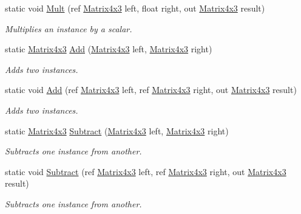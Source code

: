 \begin{DoxyCompactItemize}
static void \hyperlink{struct_open_t_k_1_1_matrix4x3_a7966689e012eb5520343aa46edee40d0}{Mult} (ref \hyperlink{struct_open_t_k_1_1_matrix4x3}{Matrix4x3} left, float right, out \hyperlink{struct_open_t_k_1_1_matrix4x3}{Matrix4x3} result)
\begin{DoxyCompactList}\small\item\em Multiplies an instance by a scalar. \end{DoxyCompactList}\item 
static \hyperlink{struct_open_t_k_1_1_matrix4x3}{Matrix4x3} \hyperlink{struct_open_t_k_1_1_matrix4x3_adc2fffc2104d93103bab87a6e57ee60b}{Add} (\hyperlink{struct_open_t_k_1_1_matrix4x3}{Matrix4x3} left, \hyperlink{struct_open_t_k_1_1_matrix4x3}{Matrix4x3} right)
\begin{DoxyCompactList}\small\item\em Adds two instances. \end{DoxyCompactList}\item 
static void \hyperlink{struct_open_t_k_1_1_matrix4x3_aa14f8cd26464c44a8638f9502ac3d318}{Add} (ref \hyperlink{struct_open_t_k_1_1_matrix4x3}{Matrix4x3} left, ref \hyperlink{struct_open_t_k_1_1_matrix4x3}{Matrix4x3} right, out \hyperlink{struct_open_t_k_1_1_matrix4x3}{Matrix4x3} result)
\begin{DoxyCompactList}\small\item\em Adds two instances. \end{DoxyCompactList}\item 
static \hyperlink{struct_open_t_k_1_1_matrix4x3}{Matrix4x3} \hyperlink{struct_open_t_k_1_1_matrix4x3_a766e4b847d45b95d9cfd58e49caee29c}{Subtract} (\hyperlink{struct_open_t_k_1_1_matrix4x3}{Matrix4x3} left, \hyperlink{struct_open_t_k_1_1_matrix4x3}{Matrix4x3} right)
\begin{DoxyCompactList}\small\item\em Subtracts one instance from another. \end{DoxyCompactList}\item 
static void \hyperlink{struct_open_t_k_1_1_matrix4x3_a0a6a59324b4cc63ad4c1cdc557f5bfc6}{Subtract} (ref \hyperlink{struct_open_t_k_1_1_matrix4x3}{Matrix4x3} left, ref \hyperlink{struct_open_t_k_1_1_matrix4x3}{Matrix4x3} right, out \hyperlink{struct_open_t_k_1_1_matrix4x3}{Matrix4x3} result)
\begin{DoxyCompactList}\small\item\em Subtracts one instance from another. \end{DoxyCompactList}\item 

\end{DoxyCompactItemize}
